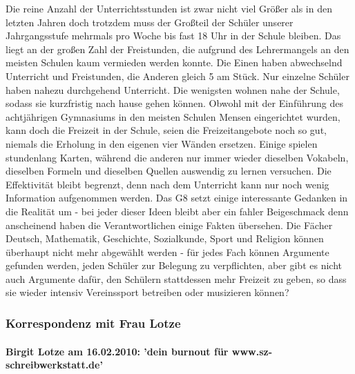 \documentclass[a4paper,12pt,oneside]{scrbook}
\begin{document}
Die reine Anzahl der Unterrichtsstunden ist zwar nicht viel Größer als in den letzten Jahren doch trotzdem muss der Großteil der Schüler unserer Jahrgangsstufe mehrmals pro Woche bis fast 18 Uhr in der Schule bleiben. Das liegt an der großen Zahl der Freistunden, die aufgrund des Lehrermangels an den meisten Schulen kaum vermieden werden konnte. Die Einen haben abwechselnd Unterricht und Freistunden, die Anderen gleich 5 am Stück. Nur einzelne Schüler haben nahezu durchgehend Unterricht. Die wenigsten wohnen nahe der Schule, sodass sie kurzfristig nach hause gehen können. Obwohl mit der Einführung des achtjährigen Gymnasiums in den meisten Schulen Mensen eingerichtet wurden, kann doch die Freizeit in der Schule, seien die Freizeitangebote noch so gut, niemals die Erholung in den eigenen vier Wänden ersetzen. Einige spielen stundenlang Karten, während die anderen nur immer wieder dieselben Vokabeln, dieselben Formeln und dieselben Quellen auswendig zu lernen versuchen. Die Effektivität bleibt begrenzt, denn nach dem Unterricht kann nur noch wenig Information aufgenommen werden.
Das G8 setzt einige interessante Gedanken in die Realität um - bei jeder dieser Ideen bleibt aber ein fahler Beigeschmack denn anscheinend haben die Verantwortlichen einige Fakten übersehen. Die Fächer Deutsch, Mathematik, Geschichte, Sozialkunde, Sport und Religion können überhaupt nicht mehr abgewählt werden - für jedes Fach können Argumente gefunden werden, jeden Schüler zur Belegung zu verpflichten, aber gibt es nicht auch Argumente dafür, den Schülern stattdessen mehr Freizeit zu geben, so dass sie wieder intensiv Vereinssport betreiben oder musizieren können?
\subsubsection{Korrespondenz mit Frau Lotze}
\paragraph{Birgit Lotze am 16.02.2010: 'dein burnout für www.sz-schreibwerkstatt.de'}
\end{document}
